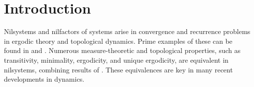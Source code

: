 \documentclass[12pt]{amsart}
\renewcommand{\labelenumi}{\arabic{enumi}.}
\renewcommand{\labelenumii}{\alph{enumii}.}
\theoremstyle{definition}
\def\lbr{\left\{}
\def\rbr{\right\}}
\def\msg{{\mathscr G}}
\def\msk{{\mathscr K}}
\def\msb{{\mathscr B}}
\def\msd{{\mathscr D}}
\def\mso{{\mathscr O}}
\def\msa{{\mathscr A}}
\def\mss{{\mathscr S}}
\def\msf{{\mathscr F}}
\def\msh{{\mathscr H}}
\def\msl{{\mathscr L}}
\def\msp{{\mathscr P}}
\def\msc{{\mathscr C}}
\def\mst{{\mathscr T}}
\def\msm{{\mathscr M}}
\def\msi{{\mathscr I}}
\def\msn{{\mathscr N}}
\def\cE{{\mathcal E}}
\def\cF{{\mathcal F}}
\def\cB{{\mathcal B}}
\def\cC{{\mathcal C}}
\def\cH{{\mathcal H}}
\def\cP{{\mathcal P}}
\def\cN{{\mathcal N}}
\def\cR{{\mathcal R}}
\def\cI{{\mathcal I}}
\def\cG{{\mathcal G}}
\def\cA{{\mathcal A}}
\def\mh{{\mathbb  H}}
\def\mq{{\mathbb  Q}}
\def\me{{\mathbb  E}}
\def\mb{{\mathbb  B}}
\def\mr{{\mathbb  R}}
\def\mm{{\mathbb  M}}
\def\mn{{\mathbb  N}}
\def\mz{{\mathbb  Z}}
\def\ms{{\mathbb  S}}
\def\mp{{\mathbb  P}}
\def\mi{{\mathbb I}}
\theoremstyle{plain}
\theoremstyle{definition}
\def\thechsec{{\thechapter}.{\thesection}}
\numberwithin{equation}{section}
\begin{document}

\newcommand{\dash}{\tikz[baseline=-0.7ex]{\draw[dashed] (0,0) -- (1.3em,0);}}



\renewcommand{\labelenumi}{\arabic{enumi}.}
\renewcommand{\labelenumii}{\alph{enumii}.}




\def\lbr{\left\{}
\def\rbr{\right\}}

\def\msg{{\mathscr G}}
\def\msk{{\mathscr K}}
\def\msb{{\mathscr B}}
\def\msd{{\mathscr D}}
\def\mso{{\mathscr O}}
\def\msa{{\mathscr A}}
\def\mss{{\mathscr S}}
\def\msf{{\mathscr F}}
\def\msh{{\mathscr H}}
\def\msl{{\mathscr L}}
\def\msp{{\mathscr P}}
\def\msc{{\mathscr C}}
\def\mst{{\mathscr T}}
\def\msm{{\mathscr M}}
\def\msi{{\mathscr I}}
\def\msn{{\mathscr N}}
\def\cE{{\mathcal E}}
\def\cF{{\mathcal F}}
\def\cB{{\mathcal B}}
\def\cC{{\mathcal C}}
\def\cH{{\mathcal H}}
\def\cP{{\mathcal P}}
\def\cN{{\mathcal N}}
\def\cR{{\mathcal R}}
\def\cI{{\mathcal I}}
\def\cG{{\mathcal G}}
\def\cA{{\mathcal A}}
\def\mh{{\mathbb  H}}
\def\mq{{\mathbb  Q}}
\def\me{{\mathbb  E}}
\def\mb{{\mathbb  B}}
\def\mr{{\mathbb  R}}
\def\mm{{\mathbb  M}}
\def\mn{{\mathbb  N}}
\def\mz{{\mathbb  Z}}
\def\ms{{\mathbb  S}}
\def\mp{{\mathbb  P}}
\def\mi{{\mathbb I}}


\def\thechsec{{\thechapter}.{\thesection}}



\maketitle

\section{Introduction}

Nilsystems and nilfactors of systems arise in convergence and recurrence problems in ergodic theory and topological dynamics. Prime examples of these can be found in \cite{topological characteristic factors} and \cite{HK paper}. Numerous measure-theoretic and topological properties, such as transitivity, minimality, ergodicity, and unique ergodicity, are equivalent in nilsystems, combining results of \cite{Auslander, Leibman, Lesigne, Parry2}. These equivalences are key in many recent developments in dynamics. 
\end{document}
